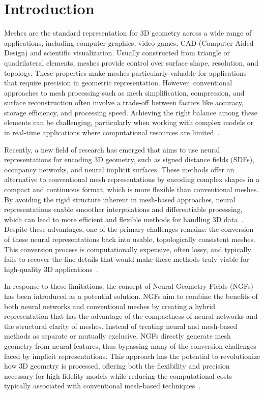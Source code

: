 \section{Introduction}
Meshes are the standard representation for 3D geometry across a wide range of applications, including computer graphics, video games, CAD (Computer-Aided Design) and scientific visualization.
Usually constructed from triangle or quadrilateral elements, meshes provide control over surface shape, resolution, and topology.
These properties make meshes particularly valuable for applications that require precision in geometric representation.
However, conventional approaches to mesh processing such as mesh simplification, compression, and surface reconstruction often involve a trade-off between factors like accuracy, storage efficiency, and processing speed.
Achieving the right balance among these elements can be challenging, particularly when working with complex models or in real-time applications where computational resources are limited~\cite{Maglo2015}.

Recently, a new field of research has emerged that aims to use neural representations for encoding 3D geometry, such as signed distance fields (SDFs), occupancy networks, and neural implicit surfaces.
These methods offer an alternative to conventional mesh representations by encoding complex shapes in a compact and continuous format, which is more flexible than conventional meshes.
By avoiding the rigid structure inherent in mesh-based approaches, neural representations enable smoother interpolations and differentiable processing, which can lead to more efficient and flexible methods for handling 3D data~\cite{Park2019}.
Despite these advantages, one of the primary challenges remains: the conversion of these neural representations back into usable, topologically consistent meshes.
This conversion process is computationally expensive, often lossy, and typically fails to recover the fine details that would make these methods truly viable for high-quality 3D applications~\cite{sivaram2024patchnets2024}.

In response to these limitations, the concept of Neural Geometry Fields (NGFs) has been introduced as a potential solution.
NGFs aim to combine the benefits of both neural networks and conventional meshes by creating a hybrid representation that has the advantage of the compactness of neural networks and the structural clarity of meshes.
Instead of treating neural and mesh-based methods as separate or mutually exclusive, NGFs directly generate mesh geometry from neural features, thus bypassing many of the conversion challenges faced by implicit representations.
This approach has the potential to revolutionize how 3D geometry is processed, offering both the flexibility and precision necessary for high-fidelity models while reducing the computational costs typically associated with conventional mesh-based techniques~\cite{sivaram2024patchnets2024}.


